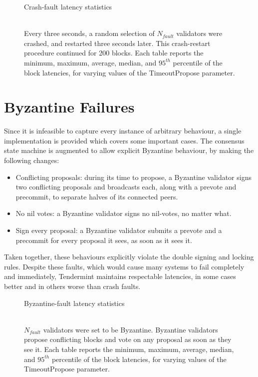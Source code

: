 \begin{figure}[]
	Crash-fault latency statistics	\\\\
	
	\caption[Latency statistics under crash faults]{Every three seconds, a random selection of $N_{fault}$ validators were crashed, and restarted three seconds later. This crash-restart procedure continued for 200 blocks. Each table reports the minimum, maximum, average, median, and $95^{th}$ percentile of the block latencies, for varying values of the TimeoutPropose parameter.}
	\label{fig:exp:crash_failure}
\end{figure}


\section{Byzantine Failures}

Since it is infeasible to capture every instance of arbitrary behaviour,
a single implementation is provided which covers some important cases.
The consensus state machine is augmented to allow explicit Byzantine behaviour,
by making the following changes:

\begin{itemize}
\item{Conflicting proposals: during its time to propose, a Byzantine validator signs two conflicting proposals and broadcasts each, along with a prevote and precommit, to separate halves of its connected peers.} 
\item{No nil votes: a Byzantine validator signs no nil-votes, no matter what.}
\item{Sign every proposal: a Byzantine validator submits a prevote and a precommit for every proposal it sees, as soon as it sees it.}
\end{itemize}

Taken together, these behaviours explicitly violate the double signing and locking rules. 
Despite these faults, which would cause many systems to fail completely and immediately,
Tendermint maintains respectable latencies, in some cases better and in others worse than crash faults.

\begin{figure}[]
	Byzantine-fault latency statistics \\\\
	
	\caption[Latency statistics under byzantine faults]{$N_{fault}$ validators were set to be Byzantine.
Byzantine validators propose conflicting blocks and vote on any proposal as soon as they see it.
Each table reports the minimum, maximum, average, median, and $95^{th}$ percentile of the block latencies, for varying values of the TimeoutPropose parameter.}
	\label{fig:exp:byz_failure}
\end{figure}




